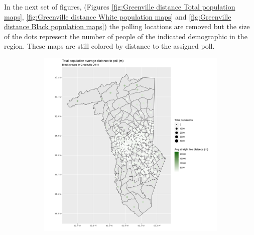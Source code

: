 \documentclass[11pt]{article}
\theoremstyle{remark}
\theoremstyle{definition}
\begin{document}
In the next set of figures, (Figures \ref{fig:Greenville distance Total population maps}, \ref{fig:Greenville  distance White population maps} and \ref{fig:Greenville distance Black population maps}) the polling locations are removed but the size of the dots represent the number of people of the indicated demographic in the region. These maps are still colored by distance to the assigned poll.

\begin{figure}
	\begin{subfigure}{.5\textwidth}
		\centering
		\includegraphics[width=\linewidth]{result_analysis/Greenville_County_SC_original_configs/population_pop_and_dist_Greenville_config_original_2018_polls.png}
		\label{sfig:York_2018_bg_dist_pop}
	\end{subfigure} 
	\begin{subfigure}{.5\textwidth}
		\centering

\end{subfigure}
\end{figure}
\end{document}
